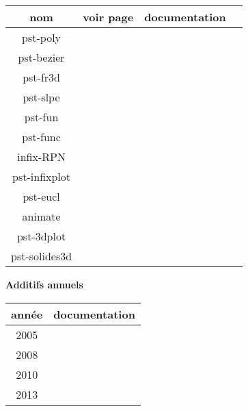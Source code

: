 %
\begin{tabular}{|c|c|c|c|}\hline 
nom 			& voir page 				& documentation\footnotemark[1] \\  \hline
pst-poly		& \pageref{poly} 			& \cite{pst-poly} 	\\ %
pst-bezier		& \pageref{bezier} 			& \cite{pst-bezier} 	\\


pst-fr3d 		& \pageref{pst-fr3d}		& \cite{pst-fr3d}\\ %
pst-slpe 		& \pageref{pst-slpe}		& \cite{pst-slpe}\\  %
pst-fun			& \pageref{fun} 			& \cite{pst-fun} 	\\
pst-func			& \pageref{func} 			& \cite{pst-func} 	\\
infix-RPN 		& \pageref{infix-RPN}		& \cite{pst-infix}\\ %
pst-infixplot 	& \pageref{pst-infixplot}  	& \cite{pst-infix}\\ %
pst-eucl 		& \pageref{pst-eucl} 		& \cite{pst-eucl}\\ %
animate 		& \pageref{anim} 			& \cite{anim}	\\ %
pst-3dplot		& \pageref{3dplot} 			& \cite{pst-3dplot}\\ %
pst-solides3d	& \pageref{sol3d} 			& \cite{pst-sol3d}\\ %
\hline 
\end{tabular}

\bigskip
\textbf{Additifs annuels}

%
\begin{tabular}{|c|c|}\hline 
année						& documentation\footnotemark[1]  \\  \hline 
2005 			& \cite{pst-news05} \\ %
2008  			& \cite{pst-news08} \\ %
2010 			& \cite{pst-news10} \\ %
2013 			& \cite{pst-news13}\\ %
\hline 
\end{tabular} 
 

